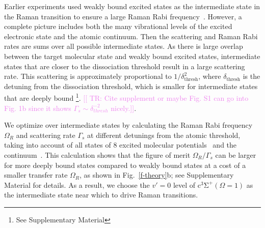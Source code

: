 \documentclass[aps,prl,twocolumn,10pt,superscriptaddress]{revtex4-1}
\newcounter{TRC}
\newcommand{\TR}[1]{\textcolor{violet}{[[\stepcounter{TRC} TR\arabic{TRC}: #1]]}}
\begin{document}
Earlier experiments used weakly bound excited states as the intermediate state
in the Raman transition to ensure a large Raman Rabi frequency~\cite{Wynar2000,Rom2004}.
However, a complete picture includes both the many vibrational levels
of the excited electronic state and the atomic continuum.
Then the scattering and Raman Rabi rates are sums over all possible intermediate states.
As there is large overlap between the target molecular state and weakly bound excited states, intermediate states that are closer to the dissociation threshold result in a large scattering rate.
This scattering is approximately proportional to $1/\delta_{\mathrm{thresh}}^2$,
where $\delta_{\mathrm{thresh}}$ is the detuning from the dissociation threshold,
which is smaller for intermediate states that are deeply bound \footnote{See Supplementary Material}. \TR{Cite supplement or maybe Fig. S1 can go into Fig. 1b since it shows $\Gamma_s\sim \delta_{thresh}^{-2}$ nicely.}.


We optimize over intermediate states by calculating the Raman Rabi frequency $\Omega_R$
and scattering rate $\Gamma_s$ at different detunings from the atomic threshold,
taking into account of all states of
8 excited molecular potentials~\cite{Korek2007, Grochola2011, Zaharova2009, Grochola2010, Zabawa2012}
and the continuum~\cite{Liu2017}.
This calculation shows that the figure of merit $\Omega_R/\Gamma_s$
can be larger for more deeply bound states compared to weakly bound states
at a cost of a smaller transfer rate $\Omega_R$, as shown in Fig.~\ref{f-theory}b;
see Supplementary Material for details.
As a result, we choose the $v'=0$ level of $\mathrm{c^3\Sigma^+}(\Omega = 1)$
as the intermediate state near which to drive Raman transitions.
\end{document}
